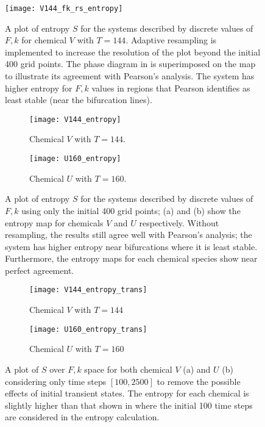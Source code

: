 \begin{figure}
	\centering
	\texttt{[image: V144\_fk\_rs\_entropy]}
	\caption{A plot of entropy $S$ for the systems described by discrete values of $F, k$ for chemical $V$ with $T = 144$. Adaptive resampling is implemented to increase the resolution of the plot beyond the initial 400 grid points. The phase diagram in  is superimposed on the map to illustrate its agreement with Pearson's analysis. The system has higher entropy for $F,k$ values in regions that Pearson identifies as least stable (near the bifurcation lines).} \label{fig:V144_fk_rs_entropy}
\end{figure}

\begin{figure}[hp!]
	\centering
	\begin{subfigure}[b]{0.48\textwidth}
		\texttt{[image: V144\_entropy]}
		\caption{Chemical $V$ with $T = 144$.} \label{fig:V144_entropy}
	\end{subfigure} \quad
	\begin{subfigure}[b]{0.48\textwidth}
		\texttt{[image: U160\_entropy]}
		\caption{Chemical $U$ with $T = 160$.} 
		\label{fig:U160_entropy}
	\end{subfigure}
	\caption{A plot of entropy $S$ for the systems described by discrete values of $F, k$ using only the initial 400 grid points; (a) and (b) show the entropy map for chemicals $V$ and $U$ respectively. Without resampling, the results still agree well with Pearson's analysis; the system has higher entropy near bifurcations where it is least stable. Furthermore, the entropy maps for each chemical species show near perfect agreement.} \label{fig:UV_entropy}
\end{figure}
%
\begin{figure}[p!]
	\centering
	\begin{subfigure}[b]{0.48\textwidth}
		\texttt{[image: V144\_entropy\_trans]}
		\caption{Chemical $V$ with $T = 144$} \label{fig:V144_entropy_trans}
	\end{subfigure} \quad
	\begin{subfigure}[b]{0.48\textwidth}
		\texttt{[image: U160\_entropy\_trans]}
		\caption{Chemical $U$ with $T = 160$} \label{fig:U160_entropy_trans}
	\end{subfigure}
	\caption{A plot of $S$ over $F, k$ space for both chemical $V$ (a) and $U$ (b) considering only time steps $[100, 2500]$ to remove the possible effects of initial transient states. The entropy for each chemical is slightly higher than that shown in  where the initial 100 time steps are considered in the entropy calculation.} \label{fig:UV_entropy_trans}
\end{figure}

